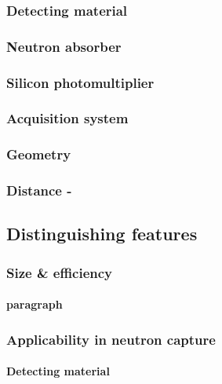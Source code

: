 \subsubsection{Detecting material}

\subsubsection{Neutron absorber}

\subsubsection{Silicon photomultiplier}

\subsubsection{Acquisition system}

\subsubsection{Geometry}

\subsubsection{Distance - }


\subsection{Distinguishing features}

\subsubsection{Size \& efficiency}

\paragraph{paragraph}

\subsubsection{Applicability in neutron capture}

\paragraph{Detecting material}\label{par:LaCl3}

